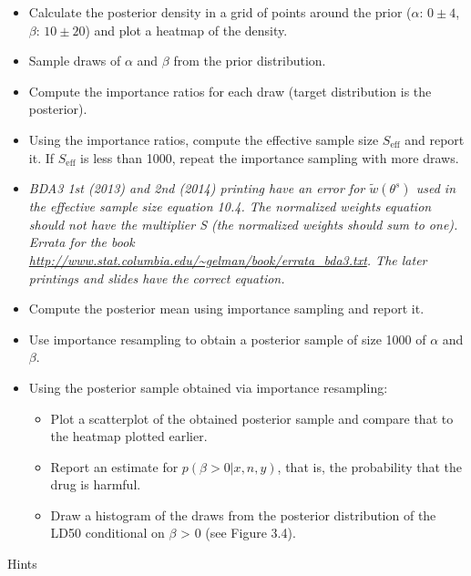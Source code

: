 \documentclass[a4paper,11pt]{article}
\begin{document}
  \begin{itemize}
  \item Calculate the posterior density in a grid of points around the prior ($\alpha$: $0 \pm 4$, $\beta$: $10 \pm 20$) and plot a heatmap of the density.
\item Sample draws of $\alpha$ and $\beta$ from the prior distribution.
\item Compute the importance ratios for each draw (target distribution is the posterior).
\item Using the importance ratios, compute the effective sample size $S_{\text{eff}}$ and report it. If $S_{\text{eff}}$ is less than 1000, repeat the importance sampling with more draws.
\item {\it BDA3 1st (2013) and 2nd (2014) printing have an error
   for $\tilde{w}(\theta^s)$ used in the effective sample size
   equation 10.4. The normalized weights equation should not have the
   multiplier S (the normalized weights should sum to one). Errata for
   the book
   \url{http://www.stat.columbia.edu/~gelman/book/errata_bda3.txt}.
   The later printings and slides have the correct equation.}
\item Compute the posterior mean using importance sampling and report it.
\item Use importance resampling to obtain a posterior sample of size 1000 of $\alpha$ and $\beta$.
\item Using the posterior sample obtained via importance resampling:
\begin{itemize}
\item Plot a scatterplot of the obtained posterior sample and compare that to the heatmap plotted earlier.
\item Report an estimate for $p(\beta > 0|x, n, y)$, that is, the probability that the drug is harmful.
\item Draw a histogram of the draws from the posterior distribution of the LD50 conditional on $\beta$ > 0 (see Figure 3.4).
\end{itemize}
  \end{itemize}
Hints
\end{document}
